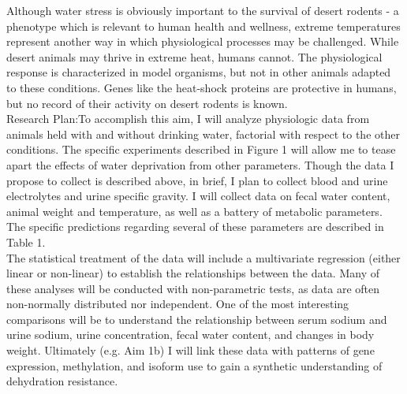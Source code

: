 \documentclass[11pt]{article}
\begin{document}

Although water stress is obviously important to the survival of desert rodents - a phenotype which is relevant to human health and wellness, extreme temperatures represent another way in which physiological processes may be challenged. While desert animals may thrive in extreme heat, humans cannot. The physiological response is characterized in model organisms, but not in other animals adapted to these conditions. Genes like the heat-shock proteins are protective in humans, but no record of their activity on desert rodents is known. \\

Research Plan:To accomplish this aim, I will analyze physiologic data from animals held with and without drinking water, factorial with respect to the other conditions. The specific experiments described in \hypertarget{Figure 1}{Figure 1} will allow me to tease apart the effects of water deprivation from other parameters. Though the data I propose to collect is described above, in brief, I plan to collect blood and urine electrolytes and urine specific gravity. I will collect data on fecal water content, animal weight and temperature, as well as a battery of metabolic parameters. The specific predictions regarding several of these parameters are described in Table 1.  \\

The statistical treatment of the data will include a multivariate regression (either linear or non-linear) to establish the relationships between the data. Many of these analyses will be conducted with non-parametric tests, as data are often non-normally distributed nor independent. One of the most interesting comparisons will be to understand the relationship between serum sodium and urine sodium, urine concentration, fecal water content, and changes in body weight. Ultimately (e.g. Aim 1b) I will link these data with patterns of gene expression, methylation, and isoform use to gain a synthetic understanding of dehydration resistance. \\
\end{document}
